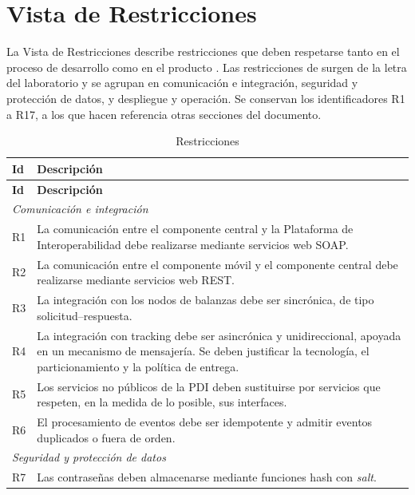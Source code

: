 \section{Vista de Restricciones}\label{sec:vista-de-restricciones}

La Vista de Restricciones describe restricciones que deben respetarse tanto en el proceso de desarrollo como en el producto \cite{Perovich2003}. Las restricciones de \solucion surgen de la letra del laboratorio \cite{LINS2026} y se agrupan en comunicación e integración, seguridad y protección de datos, y despliegue y operación. Se conservan los identificadores R1 a R17, a los que hacen referencia otras secciones del documento.

\begin{longtable}{|p{1.2cm}|p{14.3cm}|}
    \caption{Restricciones}\label{tab:restricciones}\\
    \hline
    \textbf{Id} & \textbf{Descripción} \\
    \hline
    \endfirsthead
    \hline
    \textbf{Id} & \textbf{Descripción} \\
    \hline
    \endhead
    \multicolumn{2}{|l|}{\textit{Comunicación e integración}} \\
    \hline
    R1 & La comunicación entre el componente central y la Plataforma de Interoperabilidad debe realizarse mediante servicios web SOAP. \\
    \hline
    R2 & La comunicación entre el componente móvil y el componente central debe realizarse mediante servicios web REST. \\
    \hline
    R3 & La integración con los nodos de balanzas debe ser sincrónica, de tipo solicitud--respuesta. \\
    \hline
    R4 & La integración con tracking debe ser asincrónica y unidireccional, apoyada en un mecanismo de mensajería. Se deben justificar la tecnología, el particionamiento y la política de entrega. \\
    \hline
    R5 & Los servicios no públicos de la PDI deben sustituirse por servicios que respeten, en la medida de lo posible, sus interfaces. \\
    \hline
    R6 & El procesamiento de eventos debe ser idempotente y admitir eventos duplicados o fuera de orden. \\
    \hline
    \multicolumn{2}{|l|}{\textit{Seguridad y protección de datos}} \\
    \hline
    R7 & Las contraseñas deben almacenarse mediante funciones hash con \textit{salt}. \\

\end{longtable}

